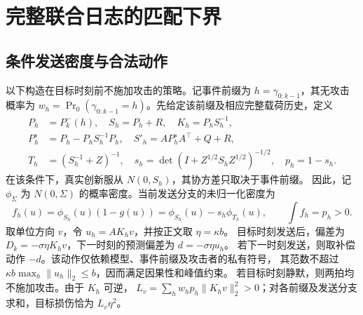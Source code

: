 \section{完整联合日志的匹配下界}
\label{app:full-kernel}
\subsection{条件发送密度与合法动作}
以下构造在目标时刻前不施加攻击的策略。记事件前缀为 $h=\gamma_{0:k-1}$，其无攻击概率为
$w_h=\Pr_0(\gamma_{0:k-1}=h)$。先给定该前缀及相应完整载荷历史，定义
\begin{equation}
 \begin{aligned}
 P_h&=P_k^-(h),\quad S_h=P_h+R,\quad K_h=P_hS_h^{-1},\\
 P_h^s&=P_h-P_hS_h^{-1}P_h,\quad S'_h=AP_h^sA^\top+Q+R,\\
 T_h&=(S_h^{-1}+Z)^{-1},\quad
 s_h=\det(I+Z^{1/2}S_hZ^{1/2})^{-1/2},\quad p_h=1-s_h.
 \end{aligned}
 \label{eq:lower-definitions}
\end{equation}
在该条件下，真实创新服从 $N(0,S_h)$，其协方差只取决于事件前缀。
因此，记 $\phi_\Sigma$ 为 $N(0,\Sigma)$ 的概率密度。当前发送分支的未归一化密度为
\begin{equation}
 f_h(u)=\phi_{S_h}(u)(1-g(u))=\phi_{S_h}(u)-s_h\phi_{T_h}(u),
 \qquad \int f_h=p_h>0.
 \label{eq:sent-density}
\end{equation}
取单位方向 $v$，令 $u_h=AK_hv$，并按正文取 $\eta=\kappa b$。
目标时刻发送后，偏差为 $D_k=-\sigma\eta K_hv$，下一时刻的预测偏差为 $d=-\sigma\eta u_h$。
若下一时刻发送，则取补偿动作 $-d$。该动作仅依赖模型、事件前缀及攻击者的私有符号，
其范数不超过 $\kappa b\max_h\|u_h\|_2\le b$，因而满足因果性和峰值约束。
若目标时刻静默，则两拍均不施加攻击。由于 $K_h$ 可逆，
$L_v=\sum_hw_hp_h\|K_hv\|_2^2>0$；对各前缀及发送分支求和，目标损伤恰为 $L_v\eta^2$。

